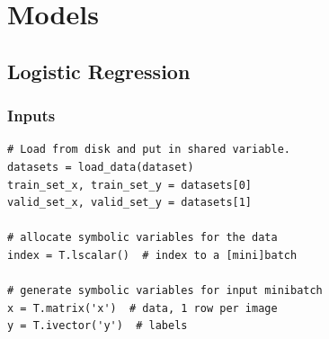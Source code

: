 \documentclass[utf8x,xcolor=pdftex,dvipsnames,table]{beamer}
\begin{document}


\section{Models}
\subsection{Logistic Regression}
\begin{frame}
  \tableofcontents[currentsection]
\end{frame}


\begin{frame}[fragile]
  \frametitle{Inputs}
\begin{lstlisting}
# Load from disk and put in shared variable.
datasets = load_data(dataset)
train_set_x, train_set_y = datasets[0]
valid_set_x, valid_set_y = datasets[1]

# allocate symbolic variables for the data
index = T.lscalar()  # index to a [mini]batch

# generate symbolic variables for input minibatch
x = T.matrix('x')  # data, 1 row per image
y = T.ivector('y')  # labels
\end{lstlisting}
\end{frame}
\end{document}
